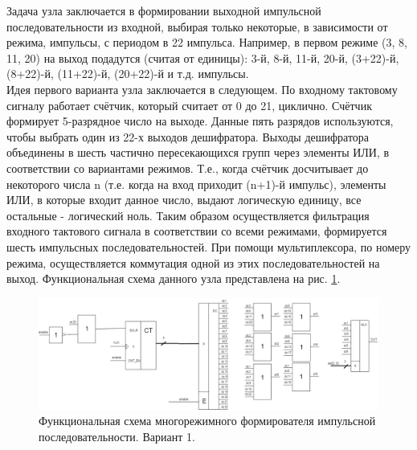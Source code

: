 Задача узла заключается в формировании выходной импульсной последовательности из входной, выбирая только некоторые, в зависимости от режима, импульсы, с периодом в 22 импульса. Например, в первом режиме (3, 8, 11, 20) на выход подадутся (считая от единицы): 3-й, 8-й, 11-й, 20-й, (3+22)-й, (8+22)-й, (11+22)-й, (20+22)-й и т.д. импульсы.\\
Идея первого варианта узла заключается в следующем. По входному тактовому сигналу работает счётчик, который считает от 0 до 21, циклично. Счётчик формирует 5-разрядное число на выходе. Данные пять разрядов используются, чтобы выбрать один из 22-х выходов дешифратора. Выходы дешифратора объединены в шесть частично пересекающихся групп через элементы ИЛИ, в соответствии со вариантами режимов. Т.е., когда счётчик досчитывает до некоторого числа n (т.е. когда на вход приходит (n+1)-й импульс), элементы ИЛИ, в которые входит данное число, выдают логическую единицу, все остальные - логический ноль. Таким образом осуществляется фильтрация входного тактового сигнала в соответствии со всеми режимами, формируется шесть импульсных последовательностей. При помощи мультиплексора, по номеру режима, осуществляется коммутация одной из этих последовательностей на выход. Функциональная схема данного узла представлена на рис. \ref{fig:firstnode}.
\begin{figure}
  \includegraphics[scale=0.35]{./first-node.png}
  \caption{Функциональная схема многорежимного формирователя импульсной последовательности. Вариант 1.}
  \label{fig:firstnode}
\end{figure}